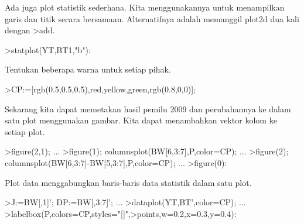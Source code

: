 \documentclass[a4paper,10pt]{article}
\begin{document}
\begin{eulernotebook}
\begin{eulercomment}
\begin{eulercomment}
\begin{eulercomment}
\begin{eulercomment}
\begin{eulercomment}
\begin{eulercomment}
\begin{eulercomment}
\begin{eulercomment}
\begin{eulercomment}
\begin{eulercomment}
\begin{eulercomment}
\begin{eulercomment}
\begin{eulercomment}
\begin{eulercomment}
\begin{eulercomment}
\begin{eulercomment}
\begin{eulercomment}
\begin{eulercomment}
\begin{eulercomment}
\begin{eulercomment}
\begin{eulercomment}
\begin{eulercomment}
\begin{eulercomment}
\begin{eulercomment}
\begin{eulercomment}
\begin{eulercomment}
\begin{eulercomment}
\begin{eulercomment}
\begin{eulercomment}
\begin{eulercomment}
\begin{eulercomment}
\begin{eulercomment}
\begin{eulerprompt}
\end{eulerprompt}
\begin{euleroutput}
  [84.29,  81.25,  81.1659,  82.7529,  72.9642,  61.8971,  79.8732]
\end{euleroutput}
\begin{eulercomment}
Ada juga plot statistik sederhana. Kita menggunakannya untuk
menampilkan garis dan titik secara bersamaan. Alternatifnya adalah
memanggil plot2d dua kali dengan \textgreater{}add.
\end{eulercomment}
\begin{eulerprompt}
>statplot(YT,BT1,"b"):
\end{eulerprompt}
\begin{eulercomment}
Tentukan beberapa warna untuk setiap pihak.
\end{eulercomment}
\begin{eulerprompt}
>CP:=[rgb(0.5,0.5,0.5),red,yellow,green,rgb(0.8,0,0)];
\end{eulerprompt}
\begin{eulercomment}
Sekarang kita dapat memetakan hasil pemilu 2009 dan perubahannya ke
dalam satu plot menggunakan gambar. Kita dapat menambahkan vektor
kolom ke setiap plot.
\end{eulercomment}
\begin{eulerprompt}
>figure(2,1);  ...
>figure(1); columnsplot(BW[6,3:7],P,color=CP); ...
>figure(2); columnsplot(BW[6,3:7]-BW[5,3:7],P,color=CP);  ...
>figure(0):
\end{eulerprompt}
\begin{eulercomment}
Plot data menggabungkan baris-baris data statistik dalam satu plot.
\end{eulercomment}
\begin{eulerprompt}
>J:=BW[,1]'; DP:=BW[,3:7]'; ...
>dataplot(YT,BT',color=CP);  ...
>labelbox(P,colors=CP,styles="[]",>points,w=0.2,x=0.3,y=0.4):
\end{eulerprompt}

\end{eulercomment}
\end{eulercomment}
\end{eulercomment}
\end{eulercomment}
\end{eulercomment}
\end{eulercomment}
\end{eulercomment}
\end{eulercomment}
\end{eulercomment}
\end{eulercomment}
\end{eulercomment}
\end{eulercomment}
\end{eulercomment}
\end{eulercomment}
\end{eulercomment}
\end{eulercomment}
\end{eulercomment}
\end{eulercomment}
\end{eulercomment}
\end{eulercomment}
\end{eulercomment}
\end{eulercomment}
\end{eulercomment}
\end{eulercomment}
\end{eulercomment}
\end{eulercomment}
\end{eulercomment}
\end{eulercomment}
\end{eulercomment}
\end{eulercomment}
\end{eulercomment}
\end{eulercomment}
\end{eulernotebook}
\end{document}
